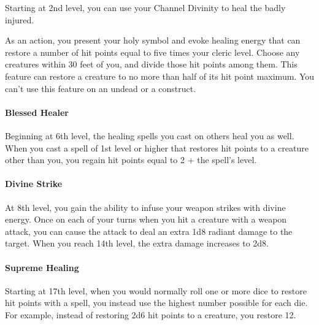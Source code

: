 \documentclass[
]{article}
\begin{document}
Starting at 2nd level, you can use your Channel Divinity to heal the
badly injured.

As an action, you present your holy symbol and evoke healing energy that
can restore a number of hit points equal to five times your cleric
level. Choose any creatures within 30 feet of you, and divide those hit
points among them. This feature can restore a creature to no more than
half of its hit point maximum. You can't use this feature on an undead
or a construct.

\hypertarget{blessed-healer}{%
\paragraph{Blessed Healer}\label{blessed-healer}}

Beginning at 6th level, the healing spells you cast on others heal you
as well. When you cast a spell of 1st level or higher that restores hit
points to a creature other than you, you regain hit points equal to 2 +
the spell's level.

\hypertarget{divine-strike}{%
\paragraph{Divine Strike}\label{divine-strike}}

At 8th level, you gain the ability to infuse your weapon strikes with
divine energy. Once on each of your turns when you hit a creature with a
weapon attack, you can cause the attack to deal an extra 1d8 radiant
damage to the target. When you reach 14th level, the extra damage
increases to 2d8.

\hypertarget{supreme-healing}{%
\paragraph{Supreme Healing}\label{supreme-healing}}

Starting at 17th level, when you would normally roll one or more dice to
restore hit points with a spell, you instead use the highest number
possible for each die. For example, instead of restoring 2d6 hit points
to a creature, you restore 12.
\end{document}
